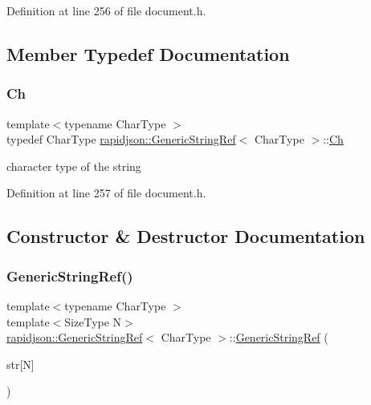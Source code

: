 Definition at line 256 of file document.\+h.



\subsection{Member Typedef Documentation}
\mbox{\label{structrapidjson_1_1_generic_string_ref_aa2a8eccae3d7eb14c30bc21afb7d6fba}} 
\subsubsection{\texorpdfstring{Ch}{Ch}}
{\footnotesize\ttfamily template$<$typename Char\+Type $>$ \\
typedef Char\+Type \mbox{\hyperlink{structrapidjson_1_1_generic_string_ref}{rapidjson\+::\+Generic\+String\+Ref}}$<$ Char\+Type $>$\+::\mbox{\hyperlink{structrapidjson_1_1_generic_string_ref_aa2a8eccae3d7eb14c30bc21afb7d6fba}{Ch}}}



character type of the string 



Definition at line 257 of file document.\+h.



\subsection{Constructor \& Destructor Documentation}
\mbox{\label{structrapidjson_1_1_generic_string_ref_acd4d5ebac2b610ce647356aa52998002}} 
\subsubsection{\texorpdfstring{GenericStringRef()}{GenericStringRef()}\hspace{0.1cm}{\footnotesize\ttfamily [1/5]}}
{\footnotesize\ttfamily template$<$typename Char\+Type $>$ \\
template$<$Size\+Type N$>$ \\
\mbox{\hyperlink{structrapidjson_1_1_generic_string_ref}{rapidjson\+::\+Generic\+String\+Ref}}$<$ Char\+Type $>$\+::\mbox{\hyperlink{structrapidjson_1_1_generic_string_ref}{Generic\+String\+Ref}} (\begin{DoxyParamCaption}\item[{const Char\+Type(\&)}]{str\mbox{[}\+N\mbox{]} }\end{DoxyParamCaption})}



